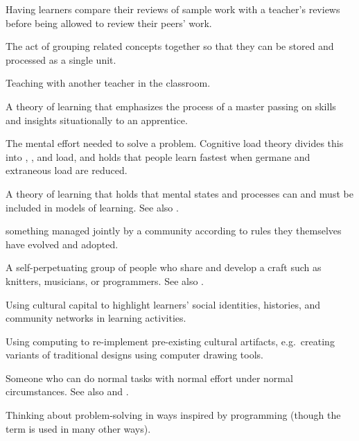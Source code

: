 \begin{description}
 Having learners
compare their reviews of sample work with a teacher's reviews before being
allowed to review their peers' work.

 The act of grouping related concepts together so
that they can be stored and processed as a single unit.

 Teaching with another teacher in the
classroom.

 A theory of
learning that emphasizes the process of a master passing on skills and insights
situationally to an apprentice.

 The mental effort needed to solve a problem.
Cognitive load theory divides this
into ,
,
and  load,
and holds that people learn fastest when germane and extraneous load are reduced.

 A theory of learning that holds that mental
states and processes can and must be included in models of learning. See also
.

 something managed jointly by a community according
to rules they themselves have evolved and adopted.

 A self-perpetuating
group of people who share and develop a craft such as knitters, musicians, or
programmers. See also
.

 Using cultural
capital to highlight learners' social identities, histories, and community
networks in learning activities.

 Using computing
to re-implement pre-existing cultural artifacts, e.g.\ creating variants of
traditional designs using computer drawing tools.

 Someone who can do
normal tasks with normal effort under normal circumstances.  See also
 and .

 Thinking about
problem-solving in ways inspired by programming (though the term is used in many
other ways).


\end{description}
